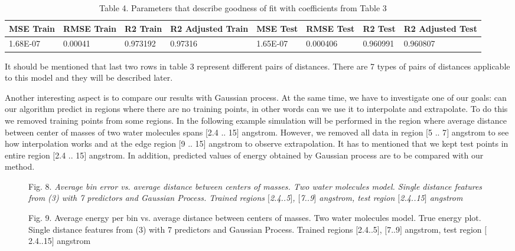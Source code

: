 \documentclass[aps,prl,reprint,amsmath,amssymb,nature]{revtex4-1}
\begin{document}
\begin{table}[h]
\caption{Table 4. Parameters that describe goodness of fit with coefficients from Table 3}
\begin{tabular}{|l|l|l|l|l|l|l|l|}
\hline
\textbf{MSE Train} & \textbf{RMSE Train} & \textbf{R2 Train} & 
\textbf{R2 Adjusted Train} & \textbf{MSE Test} & \textbf{RMSE Test
} & \textbf{R2 Test} & \textbf{R2 Adjusted Test} \\
\hline
1.68E-07 & 0.00041 & 0.973192 & 0.97316 & 1.65E-07 & 0.000406 & 0.960991 
& 0.960807 \\
\hline
\end{tabular}
\end{table}


It should be mentioned that last two rows in table 3 represent different 
pairs of distances. There are 7 types of pairs of distances applicable 
to this model and they will be described later. 

Another interesting aspect is to compare our results with Gaussian 
process. At the same time, we have to investigate one of our goals: can 
our algorithm predict in regions where there are no training points, in 
other words can we use it to interpolate and extrapolate. To do this we 
removed training points from some regions. In the following example 
simulation will be performed in the region where average distance 
between center of masses of two water molecules spans $[$2.4 .. 15$]$ 
angstrom. However, we removed all data in region $[$5 .. 7$]$ angstrom 
to see how interpolation works and at the edge region $[$9 .. 15$]$ 
angstrom to observe extrapolation. It has to mentioned that we kept test 
points in entire region $[$2.4 .. 15$]$ angstrom. In addition, predicted 
values of energy obtained by Gaussian process are to be compared with 
our method. 

\begin{figure}[h]
\centering
\caption{Fig. 8. \textit{Average bin error vs. average distance between centers 
of masses. Two water molecules model. Single distance features from (3) 
with 7 predictors and Gaussian Process. Trained regions $[$2.4..5$]$, 
$[$7..9$]$ angstrom, test region $[$2.4..15$]$ angstrom}}
\end{figure}

\begin{figure}[h]
\centering
\caption{Fig. 9. Average energy per bin vs. average distance between 
centers of masses. Two water molecules model. True energy plot. Single 
distance features from (3) with 7 predictors and Gaussian Process. 
Trained regions $[$2.4..5$]$, $[$7..9$]$ angstrom, test region 
$[$2.4..15$]$ angstrom}
\end{figure}
\end{document}
